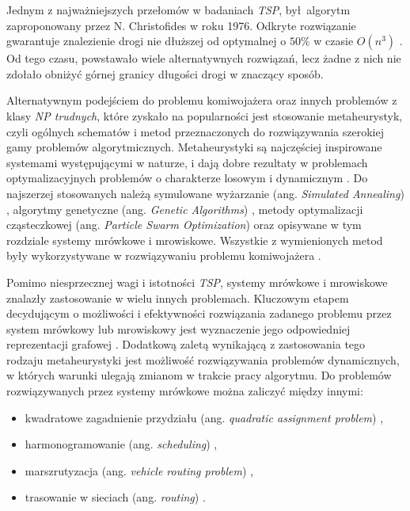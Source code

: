 {{        Jednym z najważniejszych przełomów w badaniach \textit{TSP}, był algorytm zaproponowany przez N. Christofides w
        roku 1976. Odkryte rozwiązanie gwarantuje znalezienie drogi nie dłuższej od optymalnej o $50\%$ w czasie
        $O(n^3)$ \cite{Christofides1976WorstCaseAO}. Od tego czasu, powstawało wiele alternatywnych rozwiązań, lecz żadne
        z nich nie zdołało obniżyć górnej granicy długości drogi w znaczący sposób.

        Alternatywnym podejściem do problemu komiwojażera oraz innych problemów z klasy \textit{NP trudnych}, które
        zyskało na popularności jest stosowanie metaheurystyk, czyli ogólnych schematów i metod przeznaczonych do
        rozwiązywania szerokiej gamy problemów algorytmicznych. Metaheurystyki są najczęściej inspirowane systemami
        występującymi w naturze, i dają dobre rezultaty w problemach optymalizacyjnych problemów o charakterze losowym i
        dynamicznym \cite{Bianchi2008ASO}. Do najszerzej stosowanych należą symulowane wyżarzanie (ang. \textit{Simulated
        Annealing}) \cite{Kirkpatrick1983OptimizationBS}, algorytmy genetyczne (ang. \textit{Genetic
        Algorithms}) \cite{Fraser1957SimulationOG}, metody optymalizacji cząsteczkowej (ang. \textit{Particle Swarm
        Optimization}) \cite{Poli2007ParticleSO} oraz opisywane w tym rozdziale systemy mrówkowe i mrowiskowe. Wszystkie
        z wymienionych metod były wykorzystywane w rozwiązywaniu problemu komiwojażera \cite{Prabakaran2019ASO,
        Mazidi2017MetaHeuristicAF}.

        Pomimo niesprzecznej wagi i istotności \textit{TSP}, systemy mrówkowe i mrowiskowe znalazły zastosowanie w wielu
        innych problemach. Kluczowym etapem decydującym o możliwości i efektywności rozwiązania zadanego problemu przez
        system mrówkowy lub mrowiskowy jest wyznaczenie jego odpowiedniej reprezentacji grafowej \cite{Dorigo1991AntSA}.
        Dodatkową zaletą wynikającą z zastosowania tego rodzaju metaheurystyki jest możliwość rozwiązywania problemów
        dynamicznych, w których warunki ulegają zmianom w trakcie pracy algorytmu. Do problemów rozwiązywanych przez
        systemy mrówkowe można zaliczyć między innymi:

        \begin{itemize}
            \item kwadratowe zagadnienie przydziału (ang. \textit{quadratic assignment problem}) \cite{Maniezzo1999TheAS,
            Gambardella1999AntCF},
            \item harmonogramowanie (ang. \textit{scheduling}) \cite{JSSchedulingColoroni94, Merkle2002AntCO},
            \item marszrutyzacja (ang. \textit{vehicle routing problem}) \cite{Bullnheimer1999ApplyingTA},
            \item trasowanie w sieciach (ang. \textit{routing}) \cite{Caro1999AntNetAM, Bonabeau1998RoutingIT}.
        \end{itemize}
    }

}
